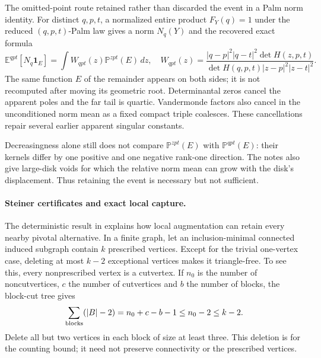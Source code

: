 \documentclass[11pt,a4paper]{article}
\theoremstyle{definition}
\theoremstyle{remark}
\numberwithin{equation}{section}
\begin{document}
The omitted-point route retained rather than discarded the event in a
Palm norm identity.  For distinct $q,p,t$, a normalized entire product
$F_Y(q)=1$ under the reduced $(q,p,t)$-Palm law gives a norm $N_q(Y)$
and the recovered exact formula
\begin{equation}
 \mathbb E^{qpt}[N_q\mathbf1_E]
 =\int W_{qpt}(z)\mathbb P^{zpt}(E)\,dz,
 \quad
 W_{qpt}(z)=
 \frac{|q-p|^2|q-t|^2\det H(z,p,t)}
      {\det H(q,p,t)|z-p|^2|z-t|^2}.
 \label{br:weighted-norm}
\end{equation}
The same function $E$ of the remainder appears on both sides; it is
not recomputed after moving its geometric root.  Determinantal zeros
cancel the apparent poles and the far tail is quartic.  Vandermonde
factors also cancel in the unconditioned norm mean as a fixed compact
triple coalesces.  These cancellations repair several earlier apparent
singular constants.

Decreasingness alone still does not compare
$\mathbb P^{zpt}(E)$ with $\mathbb P^{qpt}(E)$: their kernels differ
by one positive and one negative rank-one direction.  The notes also
give large-disk voids for which the relative norm mean can grow with
the disk's displacement.  Thus retaining the event is necessary but
not sufficient.

\paragraph{Steiner certificates and exact local capture.}
\label{br:steiner}
The deterministic result in
 explains how
local augmentation can retain every nearby pivotal alternative.
In a finite graph, let an inclusion-minimal connected induced
subgraph contain $k$ prescribed vertices. Except for the trivial
one-vertex case, deleting at most $k-2$ exceptional vertices makes
it triangle-free. To see this, every nonprescribed vertex is a
cutvertex. If $n_0$ is the number of noncutvertices, $c$ the number
of cutvertices and $b$ the number of blocks, the block-cut tree gives
\[
 \sum_{\rm blocks}(|B|-2)=n_0+c-b-1\le n_0-2\le k-2.
\]
Delete all but two vertices in each block of size at least three.
This deletion is for the counting bound; it need not preserve
connectivity or the prescribed vertices.
\end{document}
